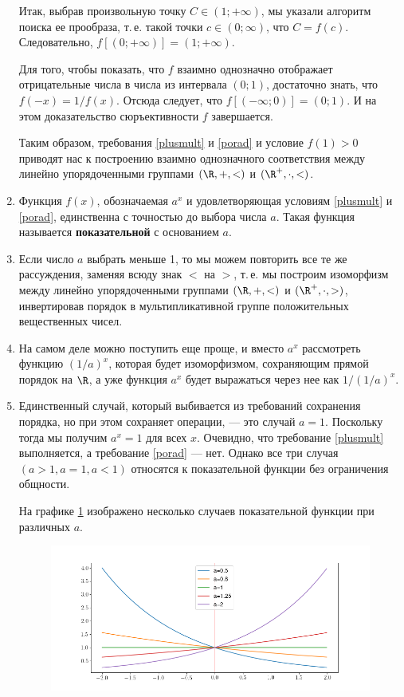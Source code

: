 \begin{enumerate}
Итак, выбрав произвольную точку $C\in(1;+\infty)$, мы указали алгоритм поиска ее прообраза, т.\,е. такой точки $c\in(0;\infty)$, что $C=f(c)$. Следовательно, $f[(0;+\infty)]=(1;+\infty)$.

Для того, чтобы показать, что $f$ взаимно однозначно отображает отрицательные числа в числа из интервала $(0;1)$, достаточно знать, что $f(-x)=1/f(x)$. Отсюда следует, что $f[(-\infty;0)]=(0;1)$. И на этом доказательство сюръективности $f$ завершается.

Таким образом, требования \eqref{plusmult} и \eqref{porad} и условие $f(1)>0$ приводят нас к построению взаимно однозначного соответствия между линейно упорядоченными группами $(\R,+,<)$ и $(\R^+,\cdot,<)$.

\item Функция $f(x)$, обозначаемая $a^x$ и удовлетворяющая условиям \eqref{plusmult} и \eqref{porad}, единственна с точностью до выбора числа $a$. Такая функция называется \textbf{показательной} с основанием $a$.




\item Если число $a$ выбрать меньше 1, то мы можем повторить все те же рассуждения, заменяя всюду знак $<$ на $>$, т.\,е. мы построим изоморфизм между линейно упорядоченными группами $(\R,+,<)$ и $(\R^+,\cdot,>)$, инвертировав порядок в мультипликативной группе положительных вещественных чисел.
\item На самом деле можно поступить еще проще, и вместо $a^x$ рассмотреть функцию $(1/a)^x$, которая будет изоморфизмом, сохраняющим прямой порядок на $\R$, а уже функция $a^x$ будет выражаться через нее как $1/(1/a)^x$.
\item Единственный случай, который выбивается из требований сохранения порядка, но при этом сохраняет операции, --- это случай $a=1$. Поскольку тогда мы получим $a^x=1$ для всех $x$. Очевидно, что требование \eqref{plusmult} выполняется, а требование \eqref{porad} --- нет. Однако все три случая $(a>1,a=1,a<1)$ относятся к показательной функции без ограничения общности.

На графике \ref{exp} изображено несколько случаев показательной функции при различных $a$.
\begin{figure}[hbt!]
\begin{center}
\includegraphics[scale=0.5]{exp.png}
\end{center}\caption{}\label{exp}
\end{figure}


\end{enumerate}
